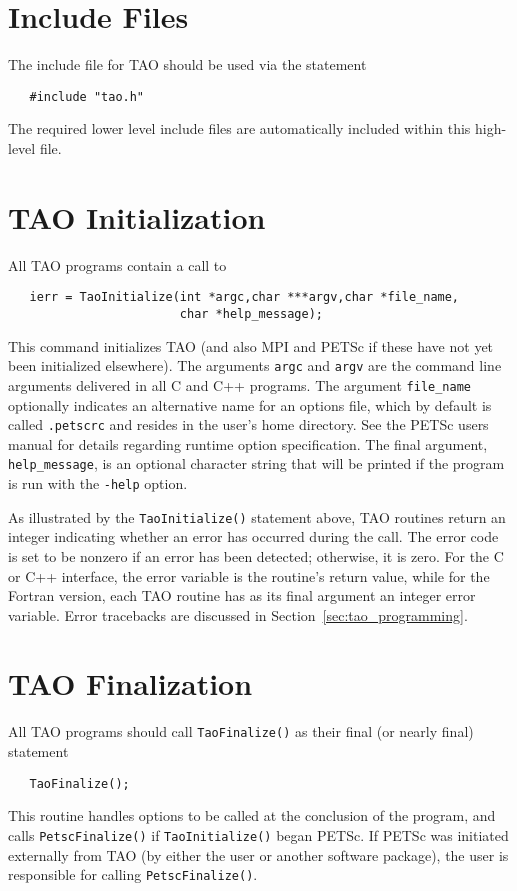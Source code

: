 \section{Include Files}

The include file for TAO should be used via the statement
\begin{verbatim}
   #include "tao.h"
\end{verbatim}
\noindent
The required lower level include files are automatically included
within this high-level file.

\section{TAO Initialization}
\label{sec:initialization}

All TAO programs contain a call to 
\begin{verbatim}
   ierr = TaoInitialize(int *argc,char ***argv,char *file_name, 
                        char *help_message);
\end{verbatim}
\noindent 
This command initializes TAO (and also MPI and PETSc if these have not
yet been initialized elsewhere).  The arguments \texttt{argc} and
\texttt{argv} are the command line arguments delivered in all C and
C++ programs.  The argument
\texttt{file\_name} optionally indicates an alternative name for an
options file, which by default is called \texttt{.petscrc} and resides
in the user's home directory.  See the PETSc users manual for details
regarding runtime option specification.  The final argument,
\texttt{help\_message}, is an optional character string that will be
printed if the program is run with the \texttt{-help} option.

As illustrated by the \texttt{TaoInitialize()} statement above, TAO
routines return an integer indicating whether an error has occurred
during the call.  The error code is set to be nonzero if an error has
been detected; otherwise, it is zero.  For the C or C++ interface, the
error variable is the routine's return value, while for the Fortran
version, each TAO routine has as its final argument an integer error
variable.  Error tracebacks are discussed in
Section~\ref{sec:tao_programming}.

\section{TAO Finalization}

All TAO programs should call \texttt{TaoFinalize()}
 as their final (or nearly final) statement
\begin{verbatim}
   TaoFinalize();
\end{verbatim}
\noindent
This routine handles options to be called at the conclusion of the
program, and calls \texttt{PetscFinalize()} %
if \texttt{TaoInitialize()} began PETSc. If PETSc was initiated
externally from TAO (by either the user or another software package),
the user is responsible for calling \texttt{PetscFinalize()}.

